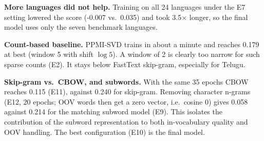 \documentclass[11pt,a4paper]{article}
\begin{document}
\textbf{More languages did not help.} Training on all 24 languages under the E7 setting lowered the score (-0.007 vs.\ 0.035) and took 3.5$\times$ longer, so the final model uses only the seven benchmark languages.

\textbf{Count-based baseline.} PPMI-SVD trains in about a minute and reaches 0.179 at best (window 5 with shift $\log 5$). A window of 2 is clearly too narrow for such sparse counts (E2). It stays below FastText skip-gram, especially for Telugu.

\textbf{Skip-gram vs.\ CBOW, and subwords.} With the same 35 epochs CBOW reaches 0.115 (E11), against 0.240 for skip-gram. Removing character n-grams (E12, 20 epochs; OOV words then get a zero vector, i.e.\ cosine 0) gives 0.058 against 0.214 for the matching subword model (E9). This isolates the contribution of the subword representation to both in-vocabulary quality and OOV handling. The best configuration (E10) is the final model.
\end{document}
